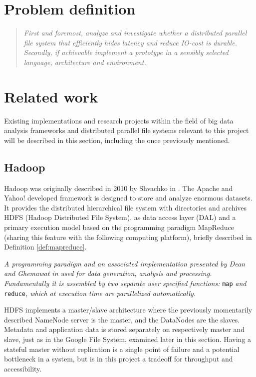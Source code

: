 \section{Problem definition} \label{sec:problem}
\begin{quotation}
\hspace*{-7mm}
\textit{First and foremost, analyze and investigate whether a distributed parallel file system that efficiently hides latency and reduce IO-cost is durable. Secondly, if achievable implement a prototype in a sensibly selected language, architecture and environment.} \newline
\end{quotation}

\section{Related work} \label{sec:related}
Existing implementations and research projects within the field of big data analysis frameworks and distributed parallel file systems relevant to this project will be described in this section, including the once previously mentioned.

\subsection*{Hadoop}
Hadoop was originally described in 2010 by Shvachko \etal in \cite{Shvachko:2010:HDF:1913798.1914427}. The Apache and Yahoo! developed framework is designed to store and analyze enormous datasets. It provides the distributed hierarchical file system with directories and archives HDFS (Hadoop Distributed File System), as data access layer (DAL) and a primary execution model based on the programming paradigm MapReduce (sharing this feature with the following computing platform), briefly described in Definition \ref{def:mapreduce}.
\vspace*{5mm}

\begin{definition}[MapReduce] \label{def:mapreduce}
\textit{A programming paradigm and an associated implementation presented by Dean and Ghemawat in} \cite{Dean:2008:MSD:1327452.1327492} \textit{used for data generation, analysis and processing. Fundamentally it is assembled by two separate user specified functions:} \texttt{map} \textit{and} \texttt{reduce}\textit{, which at execution time are parallelized automatically.}
\end{definition}

HDFS implements a master/slave architecture where the previously momentarily described NameNode server is the master, and the DataNodes are the slaves. Metadata and application data is stored separately on respectively master and slave, just as in the Google File System, examined later in this section. Having a stateful master without replication is a single point of failure and a potential bottleneck in a system, but is in this project a tradeoff for throughput and accessibility.

